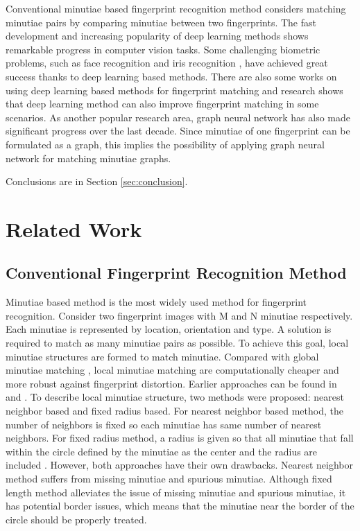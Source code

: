 \documentclass[12pt, a4paper]{article}
\begin{document}
\begin{spacing}{1}
    Conventional minutiae based fingerprint recognition method considers matching minutiae pairs by comparing minutiae between two fingerprints. The fast development and increasing popularity of deep learning methods shows remarkable progress in computer vision tasks. Some challenging biometric problems, such as face recognition \cite{SchroffCVPR2015facenet} and iris recognition \cite{ZhaoICCV2017}, have achieved great success thanks to deep learning based methods. There are also some works on using deep learning based methods for fingerprint matching and research shows that deep learning method can also improve fingerprint matching in some scenarios. As another popular research area, graph neural network has also made significant progress over the last decade. Since minutiae of one fingerprint can be formulated as a graph, this implies the possibility of applying graph neural network for matching minutiae graphs. 
    
    Conclusions are in Section \ref{sec:conclusion}.


    \section{Related Work}
    \label{sec:related}

    \subsection{Conventional Fingerprint Recognition Method}
    Minutiae based method is the most widely used method for fingerprint recognition. Consider two fingerprint images with M and N minutiae respectively. Each minutiae is represented by location, orientation and type. A solution is required to match as many minutiae pairs as possible. To achieve this goal, local minutiae structures are formed to match minutiae. Compared with global minutiae matching \cite{ChikkerurICB2006}, local minutiae matching are computationally cheaper and more robust against fingerprint distortion. Earlier approaches can be found in \cite{HrechakPR1990} and \cite{KovacsTPAMI2000}. To describe local minutiae structure, two methods were proposed: nearest neighbor based and fixed radius based. For nearest neighbor based method, the number of neighbors is fixed \cite{JiangICPR2000} so each minutiae has same number of nearest neighbors. For fixed radius method, a radius is given so that all minutiae that fall within the circle defined by the minutiae as the center and the radius are included \cite{CappelliTPAMI2010mcc}. However, both approaches have their own drawbacks. Nearest neighbor method suffers from missing minutiae and spurious minutiae. Although fixed length method alleviates the issue of missing minutiae and spurious minutiae, it has potential border issues, which means that the minutiae near the border of the circle should be properly treated.


\end{spacing}
\end{document}
